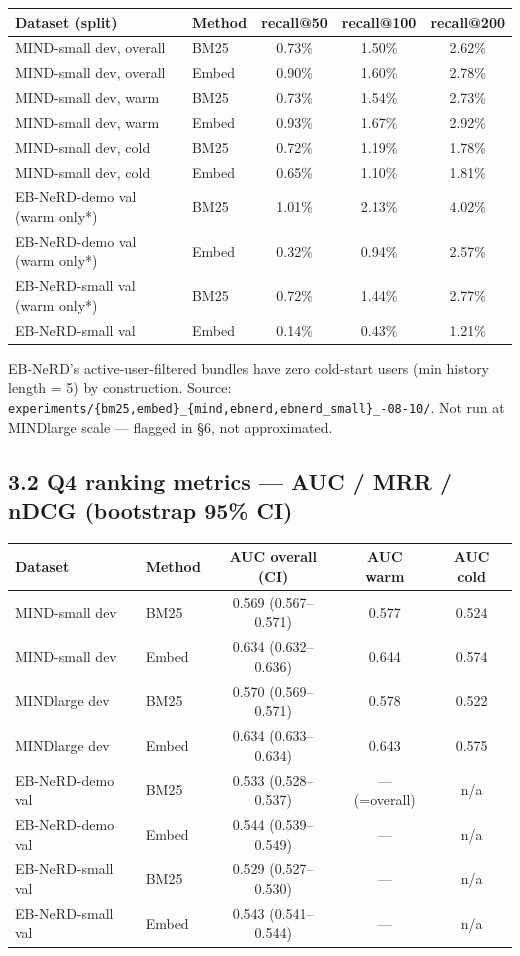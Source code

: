 \documentclass[10.5pt]{article}
\begin{document}
{\footnotesize
\begin{tabular}{@{}llccc@{}}
\toprule
Dataset (split) & Method & recall@50 & recall@100 & recall@200 \\
\midrule
MIND-small dev, overall & BM25 & 0.73\% & 1.50\% & 2.62\% \\
MIND-small dev, overall & Embed & 0.90\% & 1.60\% & 2.78\% \\
MIND-small dev, warm & BM25 & 0.73\% & 1.54\% & 2.73\% \\
MIND-small dev, warm & Embed & 0.93\% & 1.67\% & 2.92\% \\
MIND-small dev, cold & BM25 & 0.72\% & 1.19\% & 1.78\% \\
MIND-small dev, cold & Embed & 0.65\% & 1.10\% & 1.81\% \\
EB-NeRD-demo val (warm only*) & BM25 & 1.01\% & 2.13\% & 4.02\% \\
EB-NeRD-demo val (warm only*) & Embed & 0.32\% & 0.94\% & 2.57\% \\
EB-NeRD-small val (warm only*) & BM25 & 0.72\% & 1.44\% & 2.77\% \\
EB-NeRD-small val & Embed & 0.14\% & 0.43\% & 1.21\% \\
\bottomrule
\end{tabular}\par}

{\footnotesize *EB-NeRD's active-user-filtered bundles have zero cold-start
users (min history length = 5) by construction. Source:
\texttt{experiments/\allowbreak\{bm25,embed\}\_\allowbreak\{mind,ebnerd,ebnerd\_small\}\_-08-10/}.
Not run at MINDlarge scale --- flagged in \S6, not approximated.\par}

\subsection*{3.2 Q4 ranking metrics --- AUC / MRR / nDCG (bootstrap 95\% CI)}

{\footnotesize
\begin{tabular}{@{}llccc@{}}
\toprule
Dataset & Method & AUC overall (CI) & AUC warm & AUC cold \\
\midrule
MIND-small dev & BM25 & 0.569 (0.567--0.571) & 0.577 & 0.524 \\
MIND-small dev & Embed & 0.634 (0.632--0.636) & 0.644 & 0.574 \\
MINDlarge dev & BM25 & 0.570 (0.569--0.571) & 0.578 & 0.522 \\
MINDlarge dev & Embed & 0.634 (0.633--0.634) & 0.643 & 0.575 \\
EB-NeRD-demo val & BM25 & 0.533 (0.528--0.537) & --- (=overall) & n/a \\
EB-NeRD-demo val & Embed & 0.544 (0.539--0.549) & --- & n/a \\
EB-NeRD-small val & BM25 & 0.529 (0.527--0.530) & --- & n/a \\
EB-NeRD-small val & Embed & 0.543 (0.541--0.544) & --- & n/a \\
\bottomrule
\end{tabular}\par}
\end{document}
